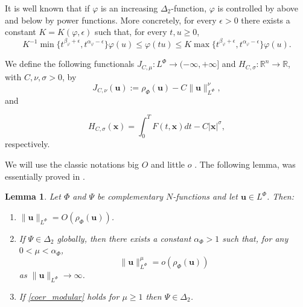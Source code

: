 \documentclass[twoside]{article}
\newtheorem{lem}[thm]{Lemma}
\theoremstyle{remark}
\newcommand{\orlnor}{\|_{L^{\Phi}}}
\newcommand{\lphi}{L^{\Phi}}
\renewcommand{\b}[1]{\boldsymbol{#1}}
\newcommand{\rr}{\mathbb{R}}
\renewcommand{\leq}{\leqslant}
\renewcommand{\geq}{\geqslant}
\begin{document}
 It is well known   that if $\varphi$ is an increasing $\Delta_2$-function, $\varphi$ is controlled by above and below 
 by power functions.  More concretely, for every $\epsilon>0$ there exists a
constant $K=K(\varphi,\epsilon)$ such that, for every $t,u\geq 0$,
\begin{equation}\label{delta2-potencias}
    K^{-1}\min\big\{t^{\beta_{\varphi}+\epsilon},t^{\alpha_{\varphi}-\epsilon} \big\}\varphi(u)\leq \varphi(t u)\leq
    K\max\big\{t^{\beta_{\varphi}+\epsilon},t^{\alpha_{\varphi}-\epsilon} \big\}\varphi(u).
\end{equation}


We define the following  functionals $J_{C,\mu}:\lphi\to (-\infty,+\infty]$ and $  H_{C,\sigma}:\rr^n\to \rr$, with $C,\nu,\sigma>0$, by
\begin{equation}\label{func_phi}
  J_{C,\nu}(\b{u}):= \rho_{\Phi}\left(\b{u}\right)-C\|\b{u}\orlnor^{\nu},
\end{equation}
 and

\begin{equation}\label{eq:functional_H}
 H_{C,\sigma}(\b{x})=\int_0^TF(t,\b{x})dt-C|\b{x}|^{\sigma},
\end{equation}
respectively.



We will use the classic notations big $O$ and little $o$ \cite{erdelyi}. The  following lemma, was essentially  proved in \cite{ABGMS2015}.



\begin{lem}\label{lem_coer} Let $\Phi$ and $\Psi$ be complementary $N$-functions and let $\b{u}\in\lphi$. Then:
\begin{enumerate}
  \item\label{th:coer_item1} $\|\b{u}\orlnor=O\left( \rho_{\Phi}\left(\b{u} \right)  \right)$.
  
  \item\label{th:coer_item2} If $\Psi \in \Delta_2$ globally, then there exists a constant $\alpha_{\Phi}>1$ such that, for any $0<\mu<\alpha_{\Phi}$,
\begin{equation}\label{coer_modular} \|\b{u}\orlnor^{\mu} =o\left(\rho_{\Phi}\left(\b{u}\right)\right)
\end{equation}
as $\|\b{u}\orlnor\to \infty$.

\item\label{th:coer_item3} If \eqref{coer_modular} holds for $\mu\geq 1$ then $\Psi \in \Delta_2$.  
\end{enumerate}
\end{lem}
\end{document}
